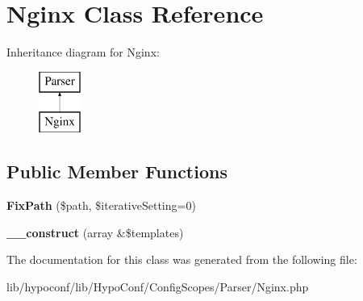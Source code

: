 \hypertarget{class_hypo_conf_1_1_config_scopes_1_1_parser_1_1_nginx}{
\section{\-Nginx \-Class \-Reference}
\label{class_hypo_conf_1_1_config_scopes_1_1_parser_1_1_nginx}
}
\-Inheritance diagram for \-Nginx\-:\begin{figure}[H]
\begin{center}
\leavevmode
\includegraphics[height=2.000000cm]{class_hypo_conf_1_1_config_scopes_1_1_parser_1_1_nginx}
\end{center}
\end{figure}
\subsection*{\-Public \-Member \-Functions}
\begin{DoxyCompactItemize}
\item 
\hypertarget{class_hypo_conf_1_1_config_scopes_1_1_parser_1_1_nginx_a89da0f26f5a59610dff3b5e50a84169b}{
{\bfseries \-Fix\-Path} (\$path, \$iterative\-Setting=0)}
\label{class_hypo_conf_1_1_config_scopes_1_1_parser_1_1_nginx_a89da0f26f5a59610dff3b5e50a84169b}

\item 
\hypertarget{class_hypo_conf_1_1_config_scopes_1_1_parser_1_1_nginx_af5f07f8aed679755846412e7a1839117}{
{\bfseries \-\_\-\-\_\-construct} (array \&\$templates)}
\label{class_hypo_conf_1_1_config_scopes_1_1_parser_1_1_nginx_af5f07f8aed679755846412e7a1839117}

\end{DoxyCompactItemize}


\-The documentation for this class was generated from the following file\-:\begin{DoxyCompactItemize}
\item 
lib/hypoconf/lib/\-Hypo\-Conf/\-Config\-Scopes/\-Parser/\-Nginx.\-php\end{DoxyCompactItemize}
